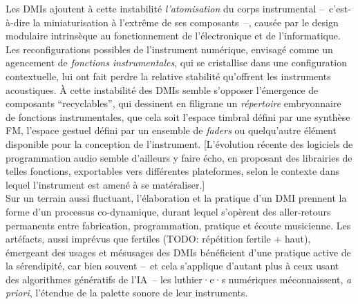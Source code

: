 Les \glspl{DMI} ajoutent à cette instabilité \textit{l'atomisation} du corps instrumental --~c'est-à-dire la miniaturisation à l'extrême de ses composants~--, causée par le design modulaire intrinsèque au fonctionnement de l'électronique et de l'informatique. Les reconfigurations possibles de l'instrument numérique, envisagé comme un agencement de \textit{fonctions instrumentales}, qui se cristallise dans une configuration contextuelle, lui ont fait perdre la relative stabilité qu'offrent les instruments acoustiques. À cette instabilité des \glspl{DMI} semble s'opposer l'émergence de composants ``recyclables'', qui dessinent en filigrane un \textit{répertoire} embryonnaire de fonctions instrumentales, que cela soit l'espace timbral défini par une synthèse FM, l'espace gestuel défini par un ensemble de \textit{faders} ou quelqu'autre élément disponible pour la conception de l'instrument.
[L'évolution récente des logiciels de programmation audio semble d'ailleurs y faire écho, en proposant des librairies de telles fonctions, exportables vers différentes plateformes, selon le contexte dans lequel l'instrument est amené à se matéraliser.]\\
\indent Sur un terrain aussi fluctuant, l'élaboration et la pratique d'un \gls{DMI} prennent la forme d'un processus co-dynamique, durant lequel s'opèrent des aller-retours permanents entre fabrication, programmation, pratique et écoute musicienne.
Les artéfacts, aussi imprévus que fertiles (TODO: répétition fertile + haut), émergeant des usages et mésusages des \glspl{DMI} bénéficient d'une pratique active de la sérendipité, car bien souvent --~et cela s'applique d'autant plus à ceux usant des algorithmes génératifs de l'IA~-- les luthier·e·s numériques méconnaissent, \textit{a priori}, l'étendue de la palette sonore de leur instruments.

